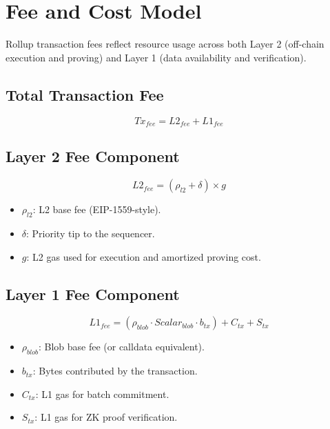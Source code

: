 \documentclass[11pt]{article}
\begin{document}
\section{Fee and Cost Model}

Rollup transaction fees reflect resource usage across both Layer 2 (off-chain execution and proving) and Layer 1 (data availability and verification).

\subsection{Total Transaction Fee}

\begin{equation}
Tx_{fee} = L2_{fee} + L1_{fee}
\end{equation}

\subsection{Layer 2 Fee Component}

\begin{equation}
L2_{fee} = (\rho_{l2} + \delta) \times g
\end{equation}

\begin{itemize}[leftmargin=1.5em]
    \item $\rho_{l2}$: L2 base fee (EIP-1559-style).
    \item $\delta$: Priority tip to the sequencer.
    \item $g$: L2 gas used for execution and amortized proving cost.
\end{itemize}

\subsection{Layer 1 Fee Component}

\begin{equation}
L1_{fee} = (\rho_{blob} \cdot Scalar_{blob} \cdot b_{tx}) + C_{tx} + S_{tx}
\end{equation}

\begin{itemize}[leftmargin=1.5em]
    \item $\rho_{blob}$: Blob base fee (or calldata equivalent).
    \item $b_{tx}$: Bytes contributed by the transaction.
    \item $C_{tx}$: L1 gas for batch commitment.
    \item $S_{tx}$: L1 gas for ZK proof verification.
\end{itemize}
\end{document}
